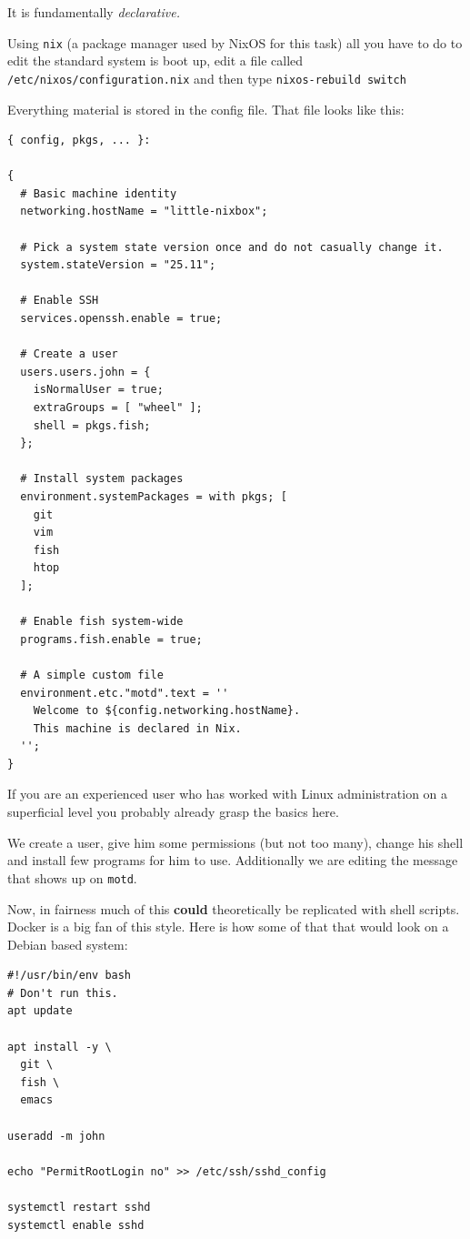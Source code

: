 \documentclass[11pt]{article}
\begin{document}
It is fundamentally \emph{declarative.}

Using \texttt{nix} (a package manager used by NixOS for this task) all you have to do to edit the standard system is boot up, edit a file called \texttt{/etc/nixos/configuration.nix} and then type \texttt{nixos-rebuild switch}

Everything material is stored in the config file. That file looks like this:

\begin{verbatim}
{ config, pkgs, ... }:

{
  # Basic machine identity
  networking.hostName = "little-nixbox";

  # Pick a system state version once and do not casually change it.
  system.stateVersion = "25.11";

  # Enable SSH
  services.openssh.enable = true;

  # Create a user
  users.users.john = {
    isNormalUser = true;
    extraGroups = [ "wheel" ];
    shell = pkgs.fish;
  };

  # Install system packages
  environment.systemPackages = with pkgs; [
    git
    vim
    fish
    htop
  ];

  # Enable fish system-wide
  programs.fish.enable = true;

  # A simple custom file
  environment.etc."motd".text = ''
    Welcome to ${config.networking.hostName}.
    This machine is declared in Nix.
  '';
}
\end{verbatim}

If  you are an experienced user who has worked with Linux administration on a superficial level you probably already grasp the basics here.

We create a user, give him some permissions (but not too many), change his shell and install few programs for him to use. Additionally we are editing the message that shows up on \texttt{motd}.

Now, in fairness much of this \textbf{could} theoretically be replicated with shell scripts. Docker is a big fan of this style. Here is how some of that that would look on a Debian based system:
\begin{verbatim}
#!/usr/bin/env bash
# Don't run this. 
apt update

apt install -y \
  git \
  fish \
  emacs

useradd -m john

echo "PermitRootLogin no" >> /etc/ssh/sshd_config

systemctl restart sshd
systemctl enable sshd
\end{verbatim}
\end{document}
